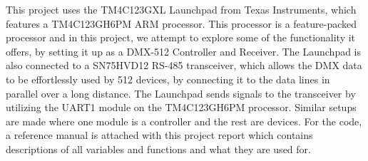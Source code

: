 This project uses the T\+M4\+C123\+G\+XL Launchpad from Texas Instruments, which features a T\+M4\+C123\+G\+H6\+PM A\+RM processor. This processor is a feature-\/packed processor and in this project, we attempt to explore some of the functionality it offers, by setting it up as a D\+M\+X-\/512 Controller and Receiver. The Launchpad is also connected to a S\+N75\+H\+V\+D12 R\+S-\/485 transceiver, which allows the D\+MX data to be effortlessly used by 512 devices, by connecting it to the data lines in parallel over a long distance. The Launchpad sends signals to the transceiver by utilizing the U\+A\+R\+T1 module on the T\+M4\+C123\+G\+H6\+PM processor. Similar setups are made where one module is a controller and the rest are devices. For the code, a reference manual is attached with this project report which contains descriptions of all variables and functions and what they are used for. 
